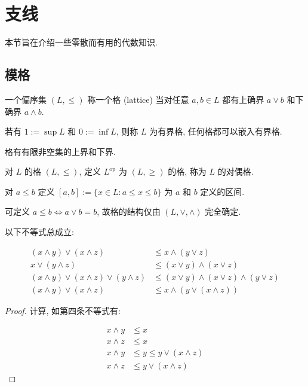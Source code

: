 \section{支线}

本节旨在介绍一些零散而有用的代数知识.

\subsection{模格}

\begin{definition}[格]
    一个偏序集 \((L,\leq)\) 称一个格 (lattice) 当对任意 \(a,b\in L\) 都有上确界 \(a \vee b\) 和下确界 \(a \wedge b\).

    若有 \(1 := \sup L\) 和 \(0 := \inf L\), 则称 \(L\) 为有界格, 任何格都可以嵌入有界格.
\end{definition}

\begin{corollary}
    格有有限非空集的上界和下界.
\end{corollary}

\begin{definition}[对偶格]
    对 \(L\) 的格 \((L,\leq)\), 定义 \(L^{\text{op}}\) 为 \((L,\geq)\) 的格, 称为 \(L\) 的对偶格.
\end{definition}

\begin{definition}[区间]
    对 \(a \leq b\) 定义 \([a,b] := \{x\in L : a \leq x \leq b\}\) 为 \(a\) 和 \(b\) 定义的区间.
\end{definition}

\begin{remark}
    可定义 \(a \leq b \iff a \vee b = b\), 故格的结构仅由 \((L,\vee,\wedge)\) 完全确定.
\end{remark}

\begin{lemma}
    以下不等式总成立:

    \[
        \begin{aligned}
            (x \wedge y) \vee (x \wedge z) &\leq x \wedge (y \vee z) \\
            x \vee (y \wedge z) &\leq (x \vee y) \wedge (x \vee z) \\
            (x \wedge y) \vee (x \wedge z) \vee (y \wedge z) &\leq (x \vee y) \wedge (x \vee z) \wedge (y \vee z) \\
            (x \wedge y) \vee (x \wedge z) &\leq x \wedge (y \vee (x \wedge z))
        \end{aligned}
    \]

    \begin{proof}
        计算, 如第四条不等式有:

        \[
            \begin{aligned}
                x \wedge y &\leq x \\
                x \wedge z &\leq x \\
                x \wedge y &\leq y \leq y \vee (x \wedge z) \\
                x \wedge z &\leq y \vee (x \wedge z)
            \end{aligned}
        \]
    \end{proof}
\end{lemma}


